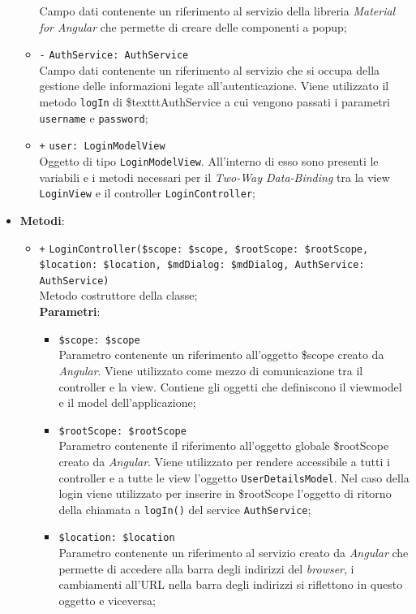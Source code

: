 \begin{itemize}
\begin{itemize}
		Campo dati contenente un riferimento al servizio della libreria \textit{Material for Angular} che permette di creare delle componenti a popup;
		\item \texttt{-} \texttt{AuthService: AuthService} \\
		Campo dati contenente un riferimento al servizio che si occupa della gestione delle informazioni legate all’autenticazione. Viene utilizzato il metodo \texttt{logIn} di \$texttt{AuthService} a cui vengono passati i parametri \texttt{username} e \texttt{password};
		\item \texttt{+} \texttt{user: LoginModelView} \\
		Oggetto di tipo \texttt{LoginModelView}. All'interno di esso sono presenti le variabili e i metodi necessari per il \textit{Two-Way Data-Binding} tra la view \texttt{LoginView} e il controller \texttt{LoginController};
	\end{itemize}
	\item \textbf{Metodi}:
	\begin{itemize}
		\item \texttt{+} \texttt{LoginController(\$scope: \$scope, \$rootScope: \$rootScope, \$location: \$location, \$mdDialog: \$mdDialog, AuthService: AuthService)} \\
		Metodo costruttore della classe; \\
		\textbf{Parametri}:
			\begin{itemize}
				\item \texttt{\$scope: \$scope} \\
				Parametro contenente un riferimento all’oggetto \$scope creato da \textit{Angular}. Viene utilizzato come mezzo di comunicazione tra il controller e la view. Contiene gli oggetti che definiscono il viewmodel e il model dell’applicazione;
				\item \texttt{\$rootScope: \$rootScope} \\
				Parametro contenente il riferimento all'oggetto globale \$rootScope creato da \textit{Angular}. Viene utilizzato per rendere accessibile a tutti i controller e a tutte le view l'oggetto \texttt{UserDetailsModel}. Nel caso della login viene utilizzato per inserire in \$rootScope l'oggetto di ritorno della chiamata a \texttt{logIn()} del service \texttt{AuthService};
				\item \texttt{\$location: \$location} \\
				Parametro contenente un riferimento al servizio creato da \textit{Angular} che permette di accedere alla barra degli indirizzi del \textit{browser}, i cambiamenti all’URL nella barra degli indirizzi si riflettono in questo oggetto e viceversa;

\end{itemize}
\end{itemize}
\end{itemize}
